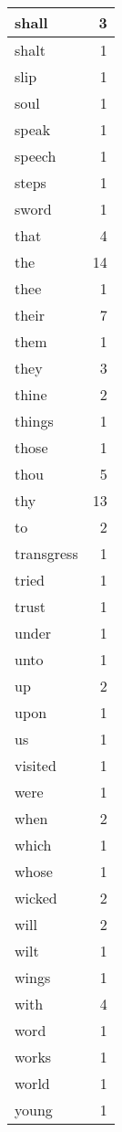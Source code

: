 \begin{center}
\begin{longtable}{l|r}
shall & 3 \\ \hline
shalt & 1 \\ \hline
slip & 1 \\ \hline
soul & 1 \\ \hline
speak & 1 \\ \hline
speech & 1 \\ \hline
steps & 1 \\ \hline
sword & 1 \\ \hline
that & 4 \\ \hline
the & 14 \\ \hline
thee & 1 \\ \hline
their & 7 \\ \hline
them & 1 \\ \hline
they & 3 \\ \hline
thine & 2 \\ \hline
things & 1 \\ \hline
those & 1 \\ \hline
thou & 5 \\ \hline
thy & 13 \\ \hline
to & 2 \\ \hline
transgress & 1 \\ \hline
tried & 1 \\ \hline
trust & 1 \\ \hline
under & 1 \\ \hline
unto & 1 \\ \hline
up & 2 \\ \hline
upon & 1 \\ \hline
us & 1 \\ \hline
visited & 1 \\ \hline
were & 1 \\ \hline
when & 2 \\ \hline
which & 1 \\ \hline
whose & 1 \\ \hline
wicked & 2 \\ \hline
will & 2 \\ \hline
wilt & 1 \\ \hline
wings & 1 \\ \hline
with & 4 \\ \hline
word & 1 \\ \hline
works & 1 \\ \hline
world & 1 \\ \hline
young & 1 \\ \hline
\end{longtable}
\end{center}



